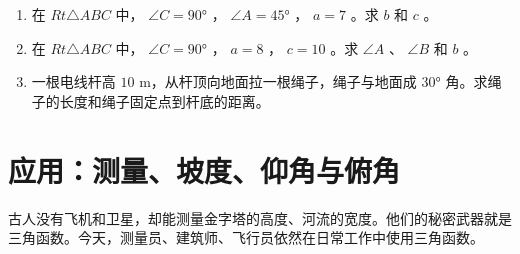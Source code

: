 \begin{practice}


\begin{enumerate}
  \item 在 $Rt\triangle ABC$ 中， $\angle C = 90°$ ， $\angle A = 45°$ ， $a = 7$ 。求 $b$ 和 $c$ 。
  \item 在 $Rt\triangle ABC$ 中， $\angle C = 90°$ ， $a = 8$ ， $c = 10$ 。求 $\angle A$ 、 $\angle B$ 和 $b$ 。
  \item 一根电线杆高 $10$ m，从杆顶向地面拉一根绳子，绳子与地面成 $30°$ 角。求绳子的长度和绳子固定点到杆底的距离。
\end{enumerate}


\end{practice}



\section*{应用：测量、坡度、仰角与俯角}


\begin{explore}


古人没有飞机和卫星，却能测量金字塔的高度、河流的宽度。他们的秘密武器就是三角函数。今天，测量员、建筑师、飞行员依然在日常工作中使用三角函数。

\end{explore}

